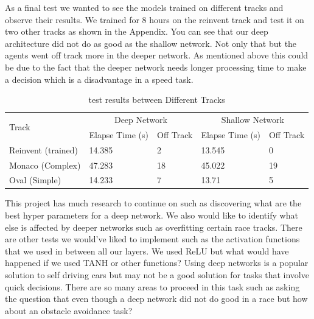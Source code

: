 \documentclass[journal]{IEEEtran}
\begin{document}
As a final test we wanted to see the models trained on different tracks and observe their results.  We trained for 8 hours on the reinvent track and test it on two other tracks as shown in the Appendix.  You can see that our deep architecture did not do as good as the shallow network.  Not only that but the agents went off track more in the deeper network.  As mentioned above this could be due to the fact that the deeper network needs longer processing time to make a decision which is a disadvantage in a speed task.

\begin{table}[t]
\centering
\caption{test results between Different Tracks}
\begin{tabular}{ |p{2cm}|p{1.25cm}|p{1cm}|p{1.25cm}|p{1cm}| }
\hline
 \multirow{2}{4em}{Track} & \multicolumn{2}{|c|}{Deep Network} & \multicolumn{2}{|c|}{Shallow Network} \\
\cline{2-5}
 & Elapse Time (s) & Off Track &  Elapse Time (s) & Off Track  \\
\hline
Reinvent (trained) & 14.385	 & 2 & 13.545	 & 0 \\ 
 \hline
Monaco (Complex) & 47.283	 & 18 & 45.022	& 19 \\ 
 \hline
Oval (Simple) & 14.233	 & 7 & 13.71 & 5 \\ 
 \hline
\end{tabular}
\label{DiffRacetrackTest}
\end{table}


This project has much research to continue on such as discovering what are the best hyper parameters for a deep network.  We also would like to identify what else is affected by deeper networks such as overfitting certain race tracks.  There are other tests we would've liked to implement such as the activation functions that we used in between all our layers.  We used ReLU but what would have happened if we used TANH or other functions?  Using deep networks is a popular solution to self driving cars but may not be a good solution for tasks that involve quick decisions.  There are so many areas to proceed in this task such as asking the question that even though a deep network did not do good in a race but how about an obstacle avoidance task?
\end{document}

